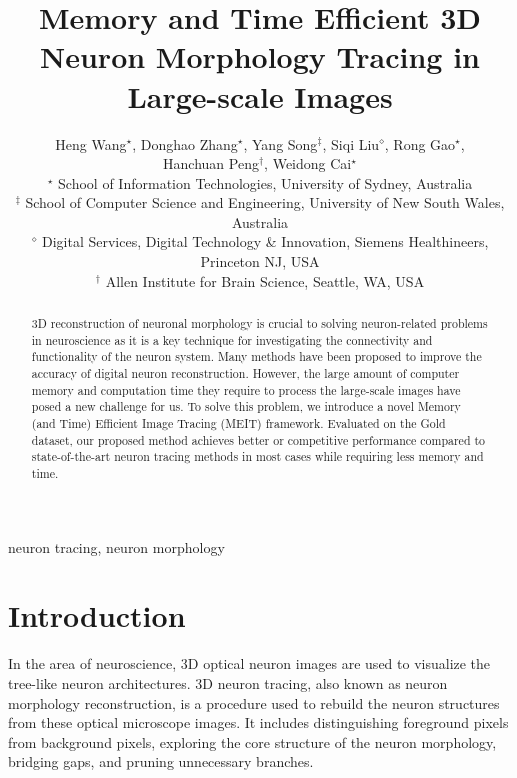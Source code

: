 \documentclass[conference]{IEEEtran}
\begin{document}
\title{Memory and Time Efficient 3D Neuron Morphology Tracing in Large-scale Images\\
}

\author{
Heng Wang$^{\star}$, Donghao Zhang$^{\star}$, Yang Song$^{\ddagger}$, Siqi Liu$^{\diamond}$, Rong Gao$^{\star}$,\\ Hanchuan Peng$^{\dagger}$, Weidong Cai$^{\star}$\\
$^{\star}$ School of Information Technologies, University of Sydney, Australia\\
$^{\ddagger}$ School of Computer Science and Engineering, University of New South Wales, Australia\\
$^{\diamond}$  Digital Services, Digital Technology \& Innovation, Siemens Healthineers, Princeton NJ, USA\\
$^{\dagger}$ Allen Institute for Brain Science, Seattle, WA, USA
}

\maketitle




\begin{abstract}
3D reconstruction of neuronal morphology is crucial to solving neuron-related problems in neuroscience as it is a key technique for investigating the connectivity and functionality of the neuron system. Many methods have been proposed to improve the accuracy of digital neuron reconstruction. However, the large amount of computer memory and computation time they require to process the large-scale images have posed a new challenge for us. To solve this problem, we introduce a novel Memory (and Time) Efficient Image Tracing (MEIT) framework. Evaluated on the Gold dataset, our proposed method achieves better or competitive performance compared to state-of-the-art neuron tracing methods in most cases while requiring less memory and time.
\end{abstract}

\begin{IEEEkeywords}
neuron tracing, neuron morphology
\end{IEEEkeywords}



\section{Introduction}
\label{sec:intro}
In the area of neuroscience, 3D optical neuron images are used to visualize the tree-like neuron architectures. 3D neuron tracing, also known as neuron morphology reconstruction, is a procedure used to rebuild the neuron structures from these optical microscope images. It includes distinguishing foreground pixels from background pixels, exploring the core structure of the neuron morphology, bridging gaps, and pruning unnecessary branches\cite{tracing_step}.
\end{document}
